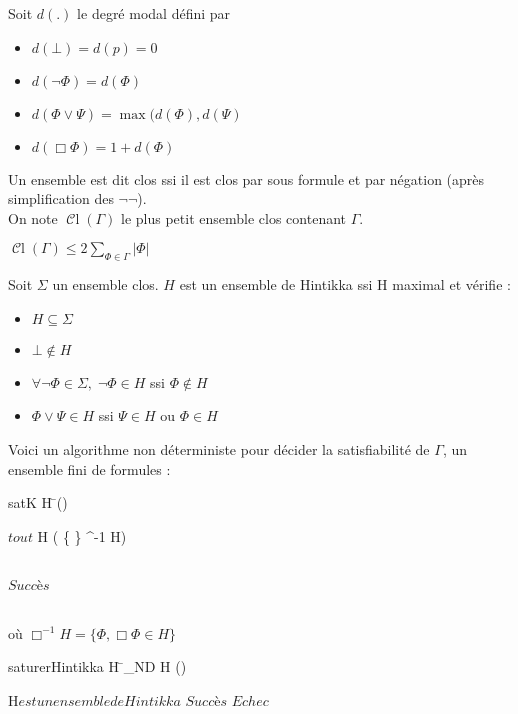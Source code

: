 \documentclass[10pt,a4paper]{article}
\DeclareMathOperator{\Cl}{\mathscr{C}l}
\begin{document}
\begin{definition}
 Soit $d(.)$ le degré modal défini par 
\begin{itemize}
 \item $d( \bot) = d( p) = 0$
 \item $ d( \lnot \Phi) = d( \Phi)$
 \item $ d( \Phi \vee \Psi) = \max( d( \Phi), d( \Psi)$
 \item $ d( \Box \Phi) = 1 + d( \Phi)$
\end{itemize}

\end{definition}

\begin{definition}
 Un ensemble est dit clos ssi il est clos par sous formule et par négation (après simplification des $\lnot \lnot$).\\
On note $\Cl(\Gamma)$ le plus petit ensemble clos contenant $ \Gamma$.
\end{definition}

\begin{prop}
 $\displaystyle \Cl(\Gamma) \leq 2 \sum_{\Phi \in \Gamma}  |  \Phi  | $  
\end{prop}

\begin{definition}
Soit $\Sigma$ un ensemble clos. $H$ est un ensemble de Hintikka ssi H maximal et vérifie :
\begin{itemize}
 \item $H \subseteq \Sigma$
 \item $\bot \not \in H$
 \item $\forall \lnot \Phi \in \Sigma, \; \lnot \Phi \in H$ ssi $\Phi \not \in H$
 \item $\Phi \vee \Psi \in H$ ssi $\Psi \in H$ ou $\Phi \in H$
\end{itemize}

\end{definition}

Voici un algorithme non déterministe pour décider la satisfiabilité de $\Gamma$, un ensemble fini de formules  :

\begin{algorithm}{satK}{\Gamma}
 H \= (\Gamma)\\
    \begin{FOR}{$tout $ \lnot \Box \Phi \in H}
	 ( \{ \lnot \Phi \} \cup \Box^{-1} H)
    \end{FOR}\\
    \RETURN $Succès$
\end{algorithm}\\
où $\Box^{-1} H = \{ \Phi, \Box \Phi \in H\}$\\
\begin{algorithm}{saturerHintikka}{\Gamma}
  H \= _{ND} \;\Gamma \subseteq H \subseteq \Cl(\Gamma)\\
  \begin{IF}{H$ est un ensemble de Hintikka$}
      $Succès$
  \ELSE
      $Echec$
\end{IF}
\end{algorithm}
\end{document}
